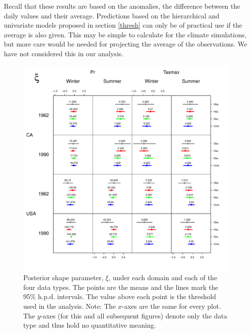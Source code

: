 \documentclass[12pt]{article}
\begin{document}
Recall that these results are based on the anomalies, the difference between the daily values and their average. Predictions based on the hierarchical and univariate models proposed in section \ref{thresh} can only be of practical use if the average is also given. This may be simple to calculate for the climate simulations, but more care would be needed for projecting the average of the observations. We have not considered this in our analysis.

\begin{figure}
\begin{center}
\includegraphics[scale=0.72]{figs/shape.pdf}
\end{center}
\caption{Posterior shape parameter, $\xi$, under each domain and each of the four data types. The points are the means and the lines mark the 95\% h.p.d. intervals. The value above each point is the threshold used in the analysis. Note: The $x$-axes are the same for every plot. The $y$-axes (for this and all subsequent figures) denote only the data type and thus hold no quantitative meaning.}
\label{ksi}
\end{figure}
\end{document}
